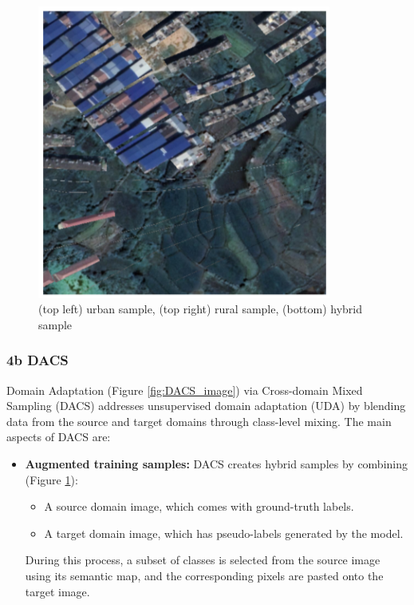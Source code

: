 \documentclass{article}
\begin{document}
\begin{multicols}{2}
\begin{figure}[H]
\begin{minipage}{0.48\linewidth}
	\end{minipage}

	\hfill
	\\
	\begin{minipage}{0.48\linewidth}
		\centering
		\includegraphics[width=1\linewidth]{image/dacs_mixed2.png}
		
	\end{minipage}


	\caption{(top left) urban sample, (top right) rural sample, (bottom) hybrid sample}
	\label{fig:DACS_image_result}

\end{figure}


	\subsubsection{4b DACS}
	
	Domain Adaptation (Figure \ref{fig:DACS_image}) via Cross-domain Mixed Sampling (DACS) \cite{tranheden2021dacs} addresses unsupervised domain adaptation (UDA) by blending data from the source and target domains through class-level mixing. The main aspects of DACS are:
	
	\begin{itemize}
		\item \textbf{Augmented training samples:} 
		DACS creates hybrid samples by combining (Figure \ref{fig:DACS_image_result}):
		\begin{itemize}
			\item A source domain image, which comes with ground-truth labels.
			\item A target domain image, which has pseudo-labels generated by the model.
		\end{itemize}
		During this process, a subset of classes is selected from the source image using its semantic map, and the corresponding pixels are pasted onto the target image.
		

\end{itemize}
\end{multicols}
\end{document}
